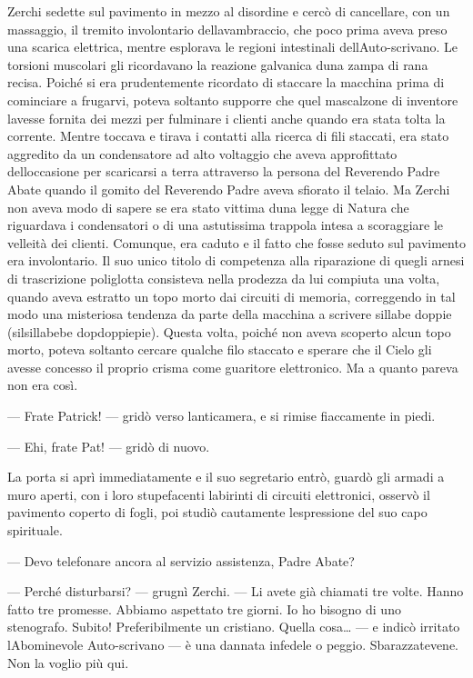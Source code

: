 	Zerchi sedette sul pavimento in mezzo al disordine e cercò di
	cancellare, con un massaggio, il tremito involontario
	dell\textquotesingle avambraccio, che poco prima aveva preso una scarica
	elettrica, mentre esplorava le regioni intestinali
	dell\textquotesingle Auto-scrivano. Le torsioni muscolari gli
	ricordavano la reazione galvanica d\textquotesingle una zampa di rana
	recisa. Poiché si era prudentemente ricordato di staccare la macchina
	prima di cominciare a frugarvi, poteva soltanto supporre che quel
	mascalzone di inventore l\textquotesingle avesse fornita dei mezzi per
	fulminare i clienti anche quando era stata tolta la corrente. Mentre
	toccava e tirava i contatti alla ricerca di fili staccati, era stato
	aggredito da un condensatore ad alto voltaggio che aveva approfittato
	dell\textquotesingle occasione per scaricarsi a terra attraverso la
	persona del Reverendo Padre Abate quando il gomito del Reverendo Padre
	aveva sfiorato il telaio. Ma Zerchi non aveva modo di sapere se era
	stato vittima d\textquotesingle una legge di Natura che riguardava i
	condensatori o di una astutissima trappola intesa a scoraggiare le
	velleità dei clienti. Comunque, era caduto e il fatto che fosse seduto
	sul pavimento era involontario. Il suo unico titolo di competenza alla
	riparazione di quegli arnesi di trascrizione poliglotta consisteva nella
	prodezza da lui compiuta una volta, quando aveva estratto un topo morto
	dai circuiti di memoria, correggendo in tal modo una misteriosa tendenza
	da parte della macchina a scrivere sillabe doppie (silsillabebe
	dopdoppiepie). Questa volta, poiché non aveva scoperto alcun topo morto,
	poteva soltanto cercare qualche filo staccato e sperare che il Cielo gli
	avesse concesso il proprio crisma come guaritore elettronico. Ma a
	quanto pareva non era così.
	
	--- Frate Patrick! --- gridò verso l\textquotesingle anticamera, e si
	rimise fiaccamente in piedi.
	
	--- Ehi, frate Pat! --- gridò di nuovo.
	
	La porta si aprì immediatamente e il suo segretario entrò, guardò gli
	armadi a muro aperti, con i loro stupefacenti labirinti di circuiti
	elettronici, osservò il pavimento coperto di fogli, poi studiò
	cautamente l\textquotesingle espressione del suo capo spirituale.
	
	--- Devo telefonare ancora al servizio assistenza, Padre Abate?
	
	--- Perché disturbarsi? --- grugnì Zerchi. --- Li avete già chiamati tre
	volte. Hanno fatto tre promesse. Abbiamo aspettato tre giorni. Io ho
	bisogno di uno stenografo. Subito! Preferibilmente un cristiano. Quella
	cosa\ldots{} --- e indicò irritato l\textquotesingle Abominevole
	Auto-scrivano --- è una dannata infedele o peggio. Sbarazzatevene. Non
	la voglio più qui.
	
